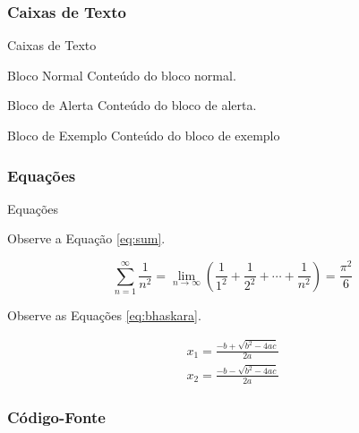 \documentclass[aspectratio=169]{beamer}
\begin{document}
\subsubsection{Caixas de Texto}

\begin{frame}{Caixas de Texto}

\begin{block}{Bloco Normal}
Conteúdo do bloco normal.
\end{block}

\begin{alertblock}{Bloco de Alerta}
Conteúdo do bloco de alerta.
\end{alertblock}

\begin{exampleblock}{Bloco de Exemplo}
Conteúdo do bloco de exemplo
\end{exampleblock}

\end{frame}

\subsubsection{Equações}

\begin{frame}{Equações}

Observe a Equação \ref{eq:sum}.

\begin{equation}\label{eq:sum}
\sum_{n=1}^\infty \frac{1}{n^2} = \lim_{n \to \infty} \left( \frac{1}{1^2} + \frac{1}{2^2} + \cdots + \frac{1}{n^2} \right) = \frac{\pi^2}{6}
\end{equation}

Observe as Equações \ref{eq:bhaskara}.

\begin{equation}\label{eq:bhaskara}
\begin{split}
x_1 = \frac{-b + \sqrt{b^2 - 4ac}}{2a} \\
x_2 = \frac{-b - \sqrt{b^2 - 4ac}}{2a}
\end{split}
\end{equation}

\end{frame}

\subsubsection{Código-Fonte}
\end{document}
